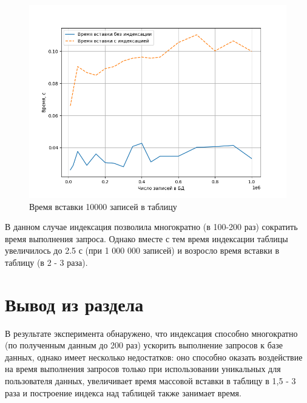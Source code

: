 \begin{figure}[H]
	\begin{center}
		\includegraphics[page=1,scale=0.8]{assets/insertion_time_username.png}
	\end{center}
	\caption{Время вставки 10000 записей в таблицу}
	\label{insertion_time_username}
\end{figure}

В данном случае индексация позволила многократно (в 100-200 раз) сократить время выполнения запроса. Однако вместе с тем время индексации таблицы увеличилось до 2.5 с (при 1 000 000 записей) и возросло время вставки в таблицу (в 2 - 3 раза).

\section{Вывод из раздела}
В результате эксперимента обнаружено, что индексация способно многократно (по полученным данным до 200 раз) ускорить выполнение запросов к базе данных, однако имеет несколько недостатков: оно способно оказать воздействие на время выполнения запросов только при использовании уникальных для пользователя данных, увеличивает время массовой вставки в таблицу в 1,5 - 3 раза и построение индекса над таблицей также занимает время.
